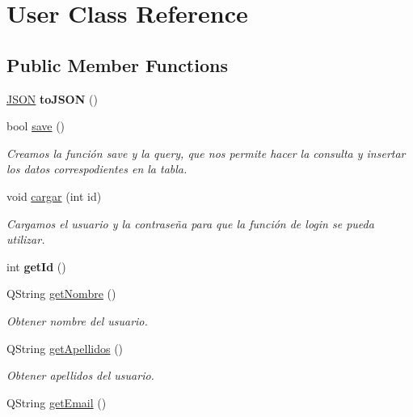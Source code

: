 \hypertarget{classUser}{}\section{User Class Reference}
\label{classUser}
\subsection*{Public Member Functions}
\begin{DoxyCompactItemize}
\item 
\mbox{\label{classUser_a51c195730a744a33925ca27ee620d92a}} 
\mbox{\hyperlink{classnlohmann_1_1basic__json}{J\+S\+ON}} {\bfseries to\+J\+S\+ON} ()
\item 
bool \mbox{\hyperlink{classUser_a6bc3635e377a3d934379add410fcf9c0}{save}} ()
\begin{DoxyCompactList}\small\item\em Creamos la función save y la query, que nos permite hacer la consulta y insertar los datos correspodientes en la tabla. \end{DoxyCompactList}\item 
void \mbox{\hyperlink{classUser_a3d1f98d7ddb605391b6d2220747c2bd5}{cargar}} (int id)
\begin{DoxyCompactList}\small\item\em Cargamos el usuario y la contraseña para que la función de login se pueda utilizar. \end{DoxyCompactList}\item 
\mbox{\label{classUser_a1e393732cd9838ab29445d9153333046}} 
int {\bfseries get\+Id} ()
\item 
Q\+String \mbox{\hyperlink{classUser_a3cc589543a052946a1255135f855b61f}{get\+Nombre}} ()
\begin{DoxyCompactList}\small\item\em Obtener nombre del usuario. \end{DoxyCompactList}\item 
Q\+String \mbox{\hyperlink{classUser_abe1cf0f201fe92b0d0f4540689477bd4}{get\+Apellidos}} ()
\begin{DoxyCompactList}\small\item\em Obtener apellidos del usuario. \end{DoxyCompactList}\item 
Q\+String \mbox{\hyperlink{classUser_ad6ef2b0be0450bdc6ac2c01ed7c8d9ca}{get\+Email}} ()

\end{DoxyCompactItemize}
